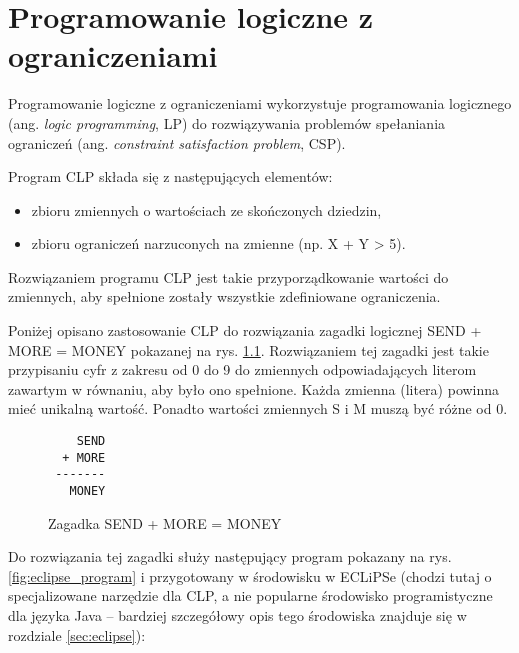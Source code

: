 \chapter{Programowanie logiczne z ograniczeniami}

\label{sec:clp}

Programowanie logiczne z ograniczeniami \cite{CLP} wykorzystuje programowania logicznego (ang. \textit{logic programming}, LP) do rozwiązywania problemów spełaniania ograniczeń (ang. \textit{constraint satisfaction problem}, CSP). 

Program CLP składa się z następujących elementów:
\begin{itemize}
\item{zbioru zmiennych o wartościach ze skończonych dziedzin,}
\item{zbioru ograniczeń narzuconych na zmienne (np. X + Y > 5).}
\end{itemize}

Rozwiązaniem programu CLP jest takie przyporządkowanie wartości do zmiennych, aby spełnione zostały wszystkie zdefiniowane ograniczenia.

Poniżej opisano zastosowanie CLP do rozwiązania zagadki logicznej SEND + MORE  = MONEY \cite{Eclipse} pokazanej na rys. \ref{fig:sendmoremoney}. Rozwiązaniem tej zagadki jest takie przypisaniu cyfr z zakresu od 0 do 9 do zmiennych odpowiadających literom zawartym w równaniu, aby było ono spełnione. Każda zmienna (litera) powinna mieć unikalną wartość. Ponadto wartości zmiennych S i M muszą być różne od 0.

\begin{figure}
\begin{center}
\begin{verbatim}
    SEND
  + MORE
 -------
   MONEY
\end{verbatim}
\end{center}
\caption{Zagadka SEND + MORE = MONEY}
\label{fig:sendmoremoney}
\end{figure}

Do rozwiązania tej zagadki służy następujący program pokazany na rys. \ref{fig:eclipse_program} i przygotowany w środowisku w ECLiPSe (chodzi tutaj o specjalizowane narzędzie dla CLP, a nie popularne środowisko programistyczne dla języka Java -- bardziej szczegółowy opis tego środowiska znajduje się w rozdziale \ref{sec:eclipse}):

